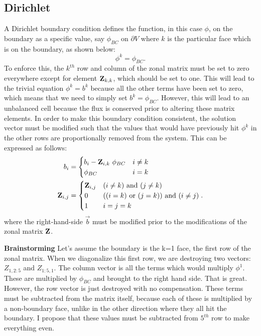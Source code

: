 \documentclass[11pt,letterpaper,oneside,notitlepage]{article}	%
\newcommand{\pindent}[1]{\hspace{6mm}}  		%
\numberwithin{equation}{section}				%
\begin{document}
\subsection{Dirichlet}%
\pindent{}A Dirichlet boundary condition defines the function, in this case $\phi$, on the boundary as a specific value, say $\phi_{BC}$ on $\partial V$ where $k$ is the particular face which is on the boundary, as shown below:
\begin{equation}
\phi^k = \phi_{BC} \label{Dirich}
.\end{equation}
To enforce this, the $k^{th}$ row and column of the zonal matrix must be set to zero everywhere except for element ${\bf Z}_{k,k}$, which should be set to one.  This will lead to the trivial equation $\phi^k=b^k$ because all the other terms have been set to zero, which means that we need to simply set $b^k=\phi_{BC}$. However, this will lead to an unbalanced cell because the flux is conserved prior to altering these matrix elements.  In order to make this boundary condition consistent, the solution vector must be modified such that the values that would have previously hit $\phi^k$ in the other rows are proportionally removed from the system. This can be expressed as follows:
\begin{align}
b_i &= \begin{cases}
b_i - {\bf Z}_{i,k}\ \phi_{BC} & i\neq k \\
\phi_{BC}	& i=k
\end{cases} \\
{\bf Z}_{i,j}&=\begin{cases}
{\bf Z}_{i,j}	& (i\neq k) \text{ and } (j\neq k) \\
0			& ((i=k) \text{ or } (j=k)) \text{ and } (i\neq j) \\
1			& i=j=k
\end{cases}\label{DirBC}.\end{align}
where the right-hand-side $\vec b$ must be modified prior to the modifications of the zonal matrix ${\bf Z}$.

{\bf Brainstorming}
Let's assume the boundary is the k=1 face, the first row of the zonal matrix. When we diagonalize this first row, we are destroying two vectors: $Z_{1,2:5}$ and $Z_{1:5,1}$. The column vector is all the terms which would multiply $\phi^1$. These are multiplied by $\phi_{BC}$ and brought to the right hand side. That is great. However, the row vector is just destroyed with no compensation. These terms must be subtracted from the matrix itself, because each of these is multiplied by a non-boundary face, unlike in the other direction where they all hit the boundary. I propose that these values must be subtracted from $5^{th}$ row to make everything even.
\end{document}
